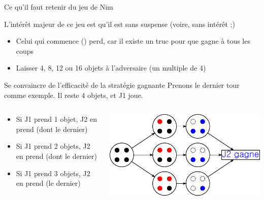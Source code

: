 \begin{frame}{Ce qu'il faut retenir du jeu de Nim}

  \begin{block}{L'intérêt majeur de ce jeu est qu'il est sans suspense 
      {\color{black}\normalsize(voire, sans intérêt ;)}}
    \begin{itemize}
    \item Celui qui commence () perd, car il existe un truc pour
      que  gagne à tous les coups
    \item {} Laisser 4, 8, 12 ou 16 objets à
      l'adversaire (un multiple de 4)
    \end{itemize}
  \end{block}

  \begin{block}{Se convaincre de l'efficacité de la stratégie gagnante}
    Prenons le dernier tour comme exemple. Il reste 4 objets, et J1 joue.

    \begin{columns}
      \begin{column}{.55\linewidth}
        \begin{itemize}
        \item Si J1 prend \alert{1} objet, J2 en prend  (dont le dernier) 
        \item Si J1 prend \alert{2} objets, J2 en prend  (dont le dernier)
        \item Si J1 prend \alert{3} objets, J2 en prend  (le dernier) 
        \end{itemize}        
      \end{column}
      \begin{column}{.45\linewidth}
        \includegraphics[width=0.8\linewidth]{img/nim4.pdf}
      \end{column}
    \end{columns}


\end{block}
\end{frame}
